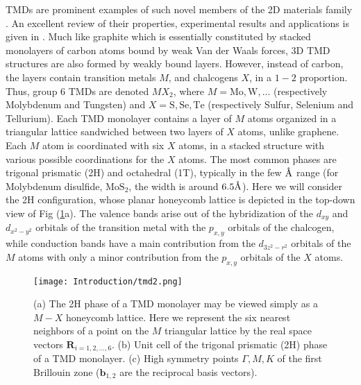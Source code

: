 \acl{TMD}s are prominent examples of such novel members of the \ac{2D} materials family \cite{wang_electronics_2012, roldan_electronic_2014, xu_spin_2014}.
An excellent review of their properties, experimental results and applications is given in \cite{manzeli_2d_2017}.
Much like graphite which is essentially constituted by stacked monolayers of carbon atoms bound by weak Van der Waals forces, 3D \ac{TMD} structures are also formed by weakly bound layers.
However, instead of carbon, the layers contain transition metals $M$, and chalcogens $X$, in a $1-2$ proportion.
Thus, group 6 \acp{TMD} are denoted $MX_2$, where $M = \text{Mo}, \text{W}, ...$ (respectively Molybdenum and Tungsten) and $X = \text{S}, \text{Se}, \text{Te}$ (respectively Sulfur, Selenium and Tellurium).
Each \acs{TMD} monolayer contains a layer of $M$ atoms organized in a triangular lattice sandwiched between two layers of $X$ atoms, unlike graphene.
Each $M$ atom is coordinated with six $X$ atoms, in a stacked structure with various possible coordinations for the $X$ atoms.
The most common phases are trigonal prismatic (2H) and octahedral (1T), typically in the few $\textup{\AA}$ range (for Molybdenum disulfide, $\text{Mo}\text{S}_2$, the width is around $6.5 \textup{\AA}$).
Here we will consider the 2H configuration, whose planar honeycomb lattice is depicted in the top-down view of Fig (\ref{fig:tmdHex}a).
The valence bands arise out of the hybridization of the $d_{xy}$ and $d_{x^2 - y^2}$ orbitals of the transition metal with the $p_{x, y}$ orbitals of the chalcogen, while conduction bands have a main contribution from the $d_{3z^2 - r^2}$ orbitals of the $M$ atoms with only a minor contribution from the $p_{x, y}$ orbitals of the $X$ atoms.
\begin{figure}[H]
\centering
\texttt{[image: Introduction/tmd2.png]}
 \caption[\ac{TMD} monolayer condensing in its 2H phase.
 $M-X$ honeycomb lattice.
 Unit cell of the trigonal prismatic (2H) phase of a \ac{TMD} monolayer.
 High symmetry points of the corresponding hexagonal lattice's  reciprocal space.]{(a) The 2H phase of a  \ac{TMD} monolayer may be viewed simply as a $M-X$ honeycomb lattice. Here we represent the six nearest neighbors of a point on the $M$ triangular lattice by the real space vectors $\bm R_{i = 1,2,..., 6}$.
(b) Unit cell of the trigonal prismatic (2H) phase of a \ac{TMD} monolayer.
(c) High symmetry points $\Gamma, M, K$ of the first Brillouin zone ($\bm b_{1,2}$ are the reciprocal basis vectors).\label{fig:tmdHex}}
\end{figure}

